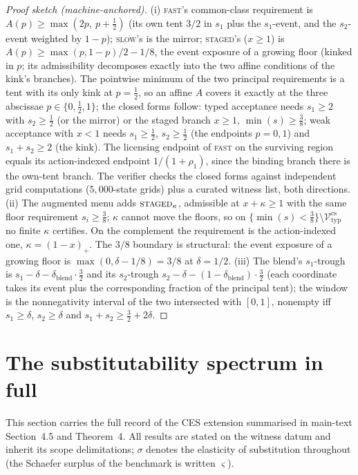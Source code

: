 \documentclass[preprint,11pt,authoryear]{elsarticle}
\theoremstyle{remark}
\newcommand{\Vtyp}{\mathcal{V}_{\mathrm{typ}}}
\newcommand{\act}[1]{\textsc{#1}}
\begin{document}
\begin{proof}[Proof sketch (machine-anchored)]
(i) \act{fast}'s common-class requirement is $A(p)\ge\max(2p,\ p+\tfrac12)$ (its own tent $3/2$ in $s_1$ plus the $s_1$-event, and the $s_2$-event weighted by $1-p$); \act{slow}'s is the mirror; \act{staged}'s ($x\ge1$) is $A(p)\ge\max(p,1-p)/2-1/8$, the event exposure of a growing floor (kinked in $p$; its admissibility decomposes exactly into the two affine conditions of the kink's branches). The pointwise minimum of the two principal requirements is a tent with its only kink at $p=\tfrac12$, so an affine $A$ covers it exactly at the three abscissae $p\in\{0,\tfrac12,1\}$; the closed forms follow: typed acceptance needs $s_1\ge2$ with $s_2\ge\tfrac12$ (or the mirror) or the staged branch $x\ge1$, $\min(s)\ge\tfrac38$; weak acceptance with $x<1$ needs $s_1\ge\tfrac12$, $s_2\ge\tfrac12$ (the endpoints $p=0,1$) and $s_1+s_2\ge2$ (the kink). The licensing endpoint of \act{fast} on the surviving region equals its action-indexed endpoint $1/(1+\rho_1)$, since the binding branch there is the own-tent branch. The verifier checks the closed forms against independent grid computations ($5{,}000$-state grids) plus a curated witness list, both directions.
(ii) The augmented menu adds $\act{staged}_\kappa$, admissible at $x+\kappa\ge1$ with the same floor requirement $s_i\ge\tfrac38$; $\kappa$ cannot move the floors, so on $\{\min(s)<\tfrac38\}\setminus\Vtyp^{\mathrm{cs}}$ no finite $\kappa$ certifies. On the complement the requirement is the action-indexed one, $\kappa=(1-x)_+$. The $3/8$ boundary is structural: the event exposure of a growing floor is $\max(0,\delta-1/8)=3/8$ at $\delta=1/2$.
(iii) The blend's $s_1$-trough is $s_1-\delta-\delta_{\mathrm{blend}}\cdot\tfrac32$ and its $s_2$-trough $s_2-\delta-(1-\delta_{\mathrm{blend}})\cdot\tfrac32$ (each coordinate takes its event plus the corresponding fraction of the principal tent); the window is the nonnegativity interval of the two intersected with $[0,1]$, nonempty iff $s_1\ge\delta$, $s_2\ge\delta$ and $s_1+s_2\ge\tfrac32+2\delta$.
\end{proof}

\section{The substitutability spectrum in full}\label{si:spectrum}

This section carries the full record of the CES extension summarised in main-text Section~4.5 and Theorem~4. All results are stated on the witness datum and inherit its scope delimitations; $\sigma$ denotes the elasticity of substitution throughout (the Schaefer surplus of the benchmark is written $\varsigma$).
\end{document}
